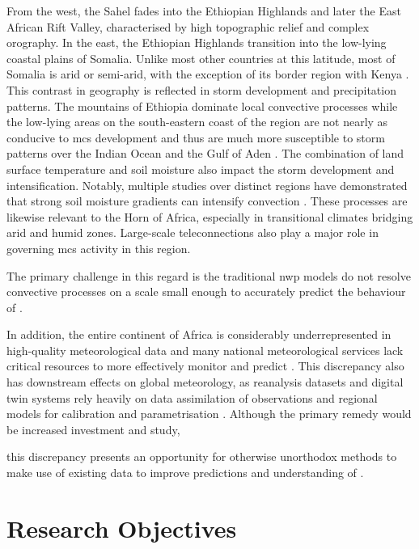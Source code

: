From the west, the Sahel fades into the Ethiopian Highlands and later the East African Rift Valley, characterised by high topographic relief and complex orography. In the east, the Ethiopian Highlands transition into the low-lying coastal plains of Somalia. Unlike most other countries at this latitude, most of Somalia is arid or semi-arid, with the exception of its border region with Kenya \citep{Beck2023}. This contrast in geography is reflected in storm development and precipitation patterns. The mountains of Ethiopia dominate local convective processes \citep{Negash2024} while the low-lying areas on the south-eastern coast of the region are not nearly as conducive to \acrshort{mcs} development and thus are much more susceptible to storm patterns over the Indian Ocean and the Gulf of Aden \citep{Camberlin2024}. The combination of land surface temperature and soil moisture also impact the storm development and intensification. Notably, multiple studies over distinct regions have demonstrated that strong soil moisture gradients can intensify convection \citep{Barton2021,Klein2020,Taylor2017}. These processes are likewise relevant to the Horn of Africa, especially in transitional climates bridging arid and humid zones. Large-scale \glspl{teleconnection} also play a major role in governing \acrshort{mcs} activity in this region. 

The primary challenge in this regard is the traditional \acrfull{nwp} models do not resolve convective processes on a scale small enough to accurately predict the behaviour of . 

In addition, the entire continent of Africa is considerably underrepresented in high-quality meteorological data and many national meteorological services lack critical resources to more effectively monitor and predict  \citep{Dinku2019,Kinyondo2018,Meque2021}. This discrepancy also has downstream effects on global meteorology, as reanalysis datasets and digital twin systems rely heavily on data assimilation of observations and regional models for calibration and parametrisation \citep{Linsenmeier2023,Valmassoi2023}. Although the primary remedy would be increased investment and study, 

this discrepancy presents an opportunity for otherwise unorthodox methods to make use of existing data to improve predictions and understanding of .

\section{Research Objectives}

